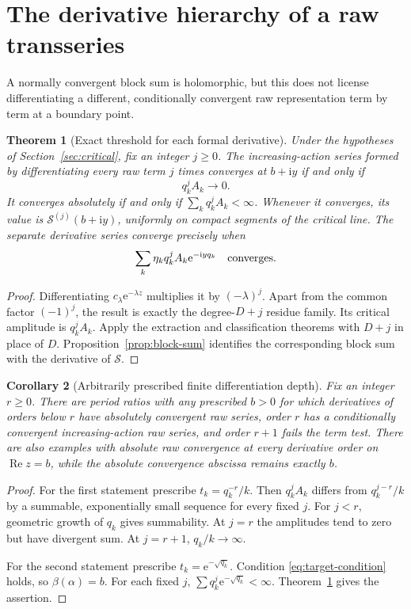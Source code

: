 \documentclass[11pt,a4paper]{article}
\numberwithin{equation}{section}
\newtheorem{theorem}{Theorem}[section]
\newtheorem{corollary}[theorem]{Corollary}
\theoremstyle{definition}
\theoremstyle{remark}
\newcommand{\e}{\mathrm e}
\newcommand{\ii}{\mathrm i}
\newcommand{\re}{\operatorname{Re}}
\newcommand{\Ssum}{\mathcal S}
\begin{document}
\section{The derivative hierarchy of a raw transseries}
\label{sec:derivatives}
A normally convergent block sum is holomorphic, but this does not
license differentiating a different, conditionally convergent raw
representation term by term at a boundary point.

\begin{theorem}[Exact threshold for each formal derivative]
\label{thm:derivatives}
Under the hypotheses of Section~\ref{sec:critical}, fix an integer
$j\ge0$. The increasing-action series formed by differentiating every
raw term $j$ times converges at $b+\ii y$ if and only if
\begin{equation}
 q_k^jA_k\longrightarrow0.
 \label{eq:derivative-test}
\end{equation}
It converges absolutely if and only if $\sum_k q_k^jA_k<\infty$.
Whenever it converges, its value is $\Ssum^{(j)}(b+\ii y)$, uniformly
on compact segments of the critical line. The separate derivative
series converge precisely when
\begin{equation}
 \sum_k\eta_k q_k^jA_k\e^{-\ii yq_k}
 \quad\hbox{converges.}
 \label{eq:separate-derivative}
\end{equation}
\end{theorem}
\begin{proof}
Differentiating $c_\lambda\e^{-\lambda z}$ multiplies it by
$(-\lambda)^j$. Apart from the common factor $(-1)^j$, the result is
exactly the degree-$D+j$ residue family. Its critical amplitude is
$q_k^jA_k$. Apply the extraction and classification theorems with
$D+j$ in place of $D$. Proposition~\ref{prop:block-sum} identifies
the corresponding block sum with the derivative of $\Ssum$.
\end{proof}

\begin{corollary}[Arbitrarily prescribed finite differentiation depth]
\label{cor:derivative-examples}
Fix an integer $r\ge0$. There are period ratios with any prescribed
$b>0$ for which derivatives of orders below $r$ have absolutely
convergent raw series, order $r$ has a conditionally convergent
increasing-action raw series, and order $r+1$ fails the term test.
There are also examples with absolute raw convergence at every
derivative order on $\re z=b$, while the absolute convergence abscissa
remains exactly $b$.
\end{corollary}
\begin{proof}
For the first statement prescribe
$t_k=q_k^{-r}/k$. Then $q_k^jA_k$ differs from $q_k^{j-r}/k$ by a
summable, exponentially small sequence for every fixed $j$.
For $j<r$, geometric growth of $q_k$ gives summability. At $j=r$
the amplitudes tend to zero but have divergent sum. At $j=r+1$,
$q_k/k\to\infty$.

For the second statement prescribe $t_k=\e^{-\sqrt{q_k}}$.
Condition \eqref{eq:target-condition} holds, so $\beta(\alpha)=b$.
For each fixed $j$, $\sum q_k^j\e^{-\sqrt{q_k}}<\infty$.
Theorem~\ref{thm:derivatives} gives the assertion.
\end{proof}
\end{document}
